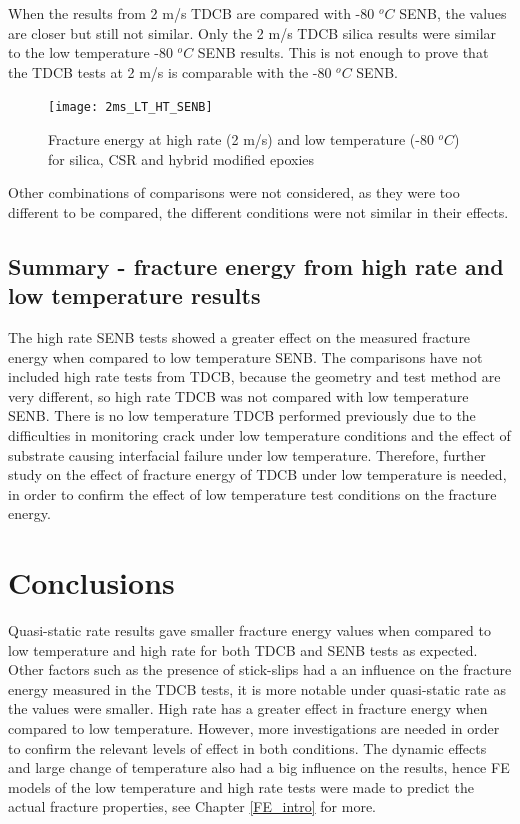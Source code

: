 \documentclass[numbers=noendperiod,chapterprefix=on]{icldt} %
\begin{document}
When the results from 2 m/s TDCB are compared with -80 $^oC$ SENB, the values are closer but still not similar. Only the 2 m/s TDCB silica results were similar to the low temperature -80 $^oC$ SENB results. This is not enough to prove that the TDCB tests at 2 m/s is comparable with the -80 $^oC$ SENB.

\begin{figure}[!htpb]
\centering
\texttt{[image: 2ms\_LT\_HT\_SENB]}
\caption{Fracture energy at high rate (2 m/s) and low temperature (-80 $^oC$) for silica, CSR and hybrid modified epoxies} \label{2ms_LT_HT_SENB}
\end{figure} 
\FloatBarrier

Other combinations of comparisons were not considered, as they were too different to be compared, the different conditions were not similar in their effects.

\subsection{Summary - fracture energy from high rate and low temperature results}
The high rate SENB tests showed a greater effect on the measured fracture energy when compared to low temperature SENB. 
The comparisons have not included high rate tests from TDCB,  because the geometry and test method are very different, so high rate TDCB was not compared with low temperature SENB. There is no low temperature TDCB performed previously due to the difficulties in monitoring crack under low temperature conditions and the effect of substrate causing interfacial failure under low temperature. Therefore, further study on the effect of fracture energy of TDCB under low temperature is needed, in order to confirm the effect of low temperature test conditions on the fracture energy.   

\section{Conclusions}
Quasi-static rate results gave smaller fracture energy values when compared to low temperature and high rate for both TDCB and SENB tests as expected. Other factors such as the presence of stick-slips had a an influence on the fracture energy measured in the TDCB tests, it is more notable under quasi-static rate as the values were smaller.
High rate has a greater effect in fracture energy when compared to low temperature. However, more investigations are needed in order to confirm the relevant levels of effect in both conditions. The dynamic effects and large change of temperature also had a big influence on the results, hence FE models of the low temperature and high rate tests were made to predict the actual fracture properties, see Chapter \ref{FE_intro} for more.   
\end{document}
